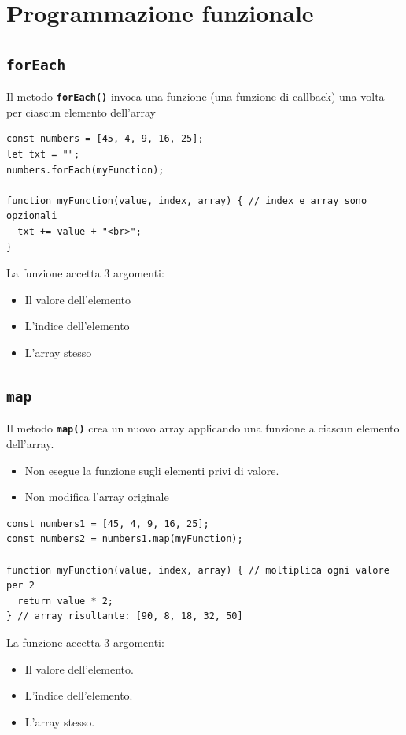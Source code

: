 \newpage
\section{Programmazione funzionale}
\subsection{\texttt{forEach}}
Il metodo \textbf{\texttt{forEach()}} invoca una funzione (una funzione di callback) una volta per ciascun elemento dell'array 
\begin{lstlisting}
const numbers = [45, 4, 9, 16, 25];
let txt = "";
numbers.forEach(myFunction);

function myFunction(value, index, array) { // index e array sono opzionali
  txt += value + "<br>";
}
\end{lstlisting}

La funzione accetta 3 argomenti:
\begin{itemize}
    \item Il valore dell'elemento
    \item L'indice dell'elemento
    \item L'array stesso
\end{itemize}

\subsection{\texttt{map}}
Il metodo \textbf{\texttt{map()}} crea un nuovo array applicando una funzione a ciascun elemento dell'array.

\begin{itemize}
    \item Non esegue la funzione sugli elementi privi di valore.
    \item Non modifica l'array originale
\end{itemize}

\begin{lstlisting}
const numbers1 = [45, 4, 9, 16, 25];
const numbers2 = numbers1.map(myFunction);

function myFunction(value, index, array) { // moltiplica ogni valore per 2
  return value * 2;
} // array risultante: [90, 8, 18, 32, 50]
\end{lstlisting}

La funzione accetta 3 argomenti:
\begin{itemize}
    \item Il valore dell'elemento.
    \item L'indice dell'elemento.
    \item L'array stesso.
\end{itemize}

